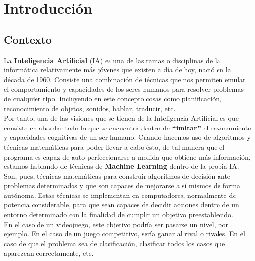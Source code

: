 \documentclass[11pt,fleqn]{book} %
\begin{document}
\part{Introducción}

\usechapterimagetrue
{} %

\chapter{Contexto}\label{sec:introduccion}

La \textbf{Inteligencia Artificial} (IA) es una de las ramas o disciplinas de la informática relativamente más jóvenes que existen a día de hoy, nació en la década de 1960. Consiste una combinación de técnicas que nos permiten emular el comportamiento y capacidades de los seres humanos para resolver problemas de cualquier tipo. Incluyendo en este concepto cosas como planificación, reconocimiento de objetos, sonidos, hablar, traducir, etc.\cite{article:IA} \\

Por tanto, una de las visiones que se tienen de la Inteligencia Artificial es que consiste en abordar todo lo que se encuentra dentro de \textbf{``imitar''} el razonamiento y capacidades cognitivas de un ser humano. Cuando hacemos uso de algoritmos y técnicas matemáticas para poder llevar a cabo ésto, de tal manera que el programa es capaz de auto-perfeccionarse a medida que obtiene más información, estamos hablando de técnicas de \textbf{Machine Learning} dentro de la propia IA. Son, pues, técnicas matemáticas para construir algoritmos de decisión ante problemas determinados y que son capaces de mejorarse a sí mismos de forma autónoma. Estas técnicas se implementan en computadores, normalmente de potencia considerable, para que sean capaces de decidir acciones dentro de un entorno determinado con la finalidad de cumplir un objetivo preestablecido. \\

En el caso de un videojuego, este objetivo podría ser pasarse un nivel, por ejemplo. En el caso de un juego competitivo, sería ganar al rival o rivales. En el caso de que el problema sea de clasificación, clasificar todos los casos que aparezcan correctamente, etc. \\
\end{document}
